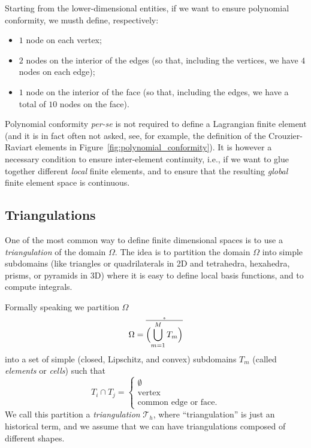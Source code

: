 Starting from the lower-dimensional entities, if we want to ensure polynomial conformity, we musth define, respectively:
\begin{itemize}
\item $1$ node on each vertex;
\item $2$ nodes on the interior of the edges (so that, including the vertices, we have $4$ nodes on each edge);
\item $1$ node on the interior of the face (so that, including the edges, we have a total of $10$ nodes on the face).
\end{itemize}

\begin{remark}
Polynomial conformity \emph{per-se} is not required to define a Lagrangian finite element (and it is in fact often not asked, see, for example, the definition of the Crouzier-Raviart elements in Figure~\ref{fig:polynomial_conformity}). It is however a necessary condition to ensure inter-element continuity, i.e., if we want to glue together different \emph{local} finite elements, and to ensure that the resulting \emph{global} finite element space is continuous.
\end{remark}

\subsection{Triangulations}

One of the most common way to define finite dimensional spaces is to use a
\emph{triangulation} of the domain $\Omega$. The idea is to partition the domain
$\Omega$ into simple subdomains (like triangles or quadrilaterals in 2D and
tetrahedra, hexahedra, prisms, or pyramids in 3D) where it is easy to define
local basis functions, and to compute integrals.

Formally speaking we partition $\Omega$
\begin{equation*}
\Omega = \mathring{\overline{\Bigl(\bigcup_{m=1}^M T_m \Bigr)}}
\end{equation*}
into a set of simple (closed, Lipschitz, and convex) subdomains $T_m$ (called \emph{elements} or \emph{cells})
such that 
\begin{equation}
T_i \cap T_j = \begin{cases}\emptyset \\ \text{vertex} \\ \text{common edge or face}.\end{cases}
\end{equation}
We call this partition a \emph{triangulation} $\mathcal{T}_h$, where
``triangulation'' is just an historical term, and we assume that we can have
triangulations composed of different shapes.

